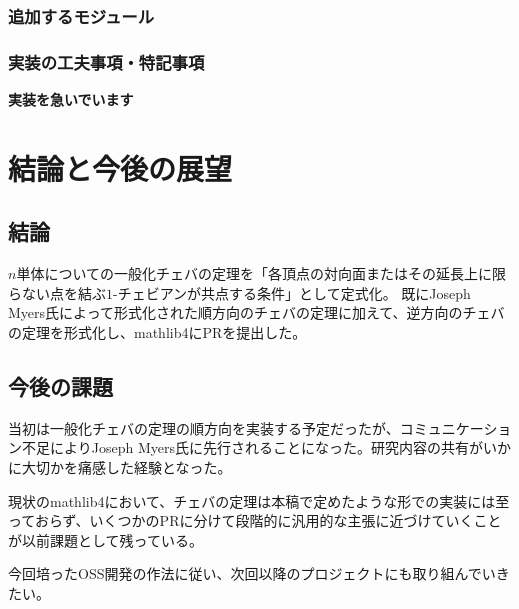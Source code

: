\documentclass[a4paper,12pt]{bxjsbook}
\newlength{\customindent}
\newenvironment{body}{
  \par
  \begingroup
  \setlength{\leftskip}{\customindent}
  \setlength{\rightskip}{0pt}
  \setlength{\parindent}{1em}
  \setlength{\displayindent}{\customindent}
  \setlength{\displaywidth}{\dimexpr\linewidth-\customindent\relax}
}{
  \par
  \endgroup
}
\theoremstyle{theorem}
\begin{document}
    \subsection{追加するモジュール}

    \subsection{実装の工夫事項・特記事項}
    \begin{bodydescription}
        \item \textbf{実装を急いでいます}
    \end{bodydescription}

    \chapter{結論と今後の展望}

    \section{結論}
    \begin{body}
        \indent $n$単体についての一般化チェバの定理を「各頂点の対向面またはその延長上に限らない点を結ぶ$1$-チェビアンが共点する条件」として定式化。
        既にJoseph Myers氏によって形式化された順方向のチェバの定理に加えて、逆方向のチェバの定理を形式化し、mathlib4にPRを提出した。
    \end{body}

    \section{今後の課題}
    \begin{body}
        \indent 当初は一般化チェバの定理の順方向を実装する予定だったが、コミュニケーション不足によりJoseph Myers氏に先行されることになった。研究内容の共有がいかに大切かを痛感した経験となった。

        \indent 現状のmathlib4において、チェバの定理は本稿で定めたような形での実装には至っておらず、いくつかのPRに分けて段階的に汎用的な主張に近づけていくことが以前課題として残っている。
        
        \indent 今回培ったOSS開発の作法に従い、次回以降のプロジェクトにも取り組んでいきたい。
    \end{body}
\end{document}
